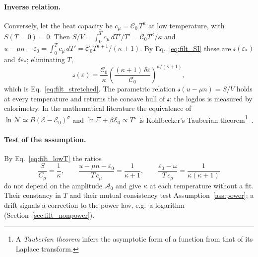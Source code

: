 \documentclass[10pt,a4paper]{article}
\theoremstyle{plain}
\newcommand{\cN}{\mathcal{N}}   %
\newcommand{\cA}{{\mathcal{A}_0}}   %
\newcommand{\lndos}{{logdos}}  %
\newcommand{\enrg}{\mathcal{E}}  %
\newcommand{\lds}{\mathscr{s}}  %
\begin{document}
\paragraph{Inverse relation.} Conversely, let the heat capacity be
$ c_\mu = \mathcal C_0\,T^{\kappa} $ at low temperature, with $S(T=0)=0$.
Then
$S/V = \int_0^{T}c_\mu\,dT'/T' = \mathcal C_0T^{\kappa}/\kappa$ and
$u-\mu n-\varepsilon_0 = \int_0^{T}c_\mu\,dT' = \mathcal C_0T^{\kappa+1}/(\kappa+1)$.
By Eq.~\eqref{eq:filt_SI} these are $\lds(\varepsilon_*)$ and
$\delta\varepsilon_*$; eliminating $T$,
\begin{equation}\label{eq:filt_sinv}
  \lds(\varepsilon) = \frac{\mathcal C_0}{\kappa}
  \left(\frac{(\kappa+1)\,\delta\varepsilon}{\mathcal C_0}\right)^{\kappa/(\kappa+1)} ,
\end{equation}
which is Eq.~\eqref{eq:filt_stretched}. The parametric relation
$\lds(u-\mu n)=S/V$ holds at every temperature and returns the concave hull of
$\lds$: the \lndos{} is measured by calorimetry. In the mathematical
literature the equivalence of $\ln\cN\simeq B(\enrg-\enrg_0)^{\sigma}$ and
$\ln\Xi+\beta\enrg_0\propto T^{\kappa}$ is Kohlbecker's Tauberian
theorem\footnote{A \emph{Tauberian theorem} infers the asymptotic form of a
function from that of its Laplace transform.}~\cite[Sec.~4.12]{BGT}.

\paragraph{Test of the assumption.} By Eq.~\eqref{eq:filt_lowT} the ratios
\[
  \frac{S}{C_\mu}=\frac1\kappa ,\qquad
  \frac{u-\mu n-\varepsilon_0}{T\,c_\mu}=\frac{1}{\kappa+1} ,\qquad
  \frac{\varepsilon_0-\omega}{T\,c_\mu}=\frac{1}{\kappa(\kappa+1)}
\]
do not depend on the amplitude $\cA$ and give $\kappa$ at each temperature
without a fit. Their constancy in $T$ and their mutual consistency test
Assumption~\ref{ass:power}; a drift signals a correction to the power law,
e.g.\ a logarithm (Section~\ref{sec:filt_nonpower}).
\end{document}
